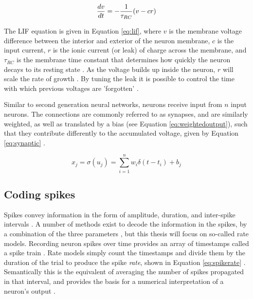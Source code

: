 \documentclass[report.tex]{subfiles}
\begin{document}
\begin{equation}
  \frac{dv}{dt} = - {1 \over \tau_{RC}} (v - cr)
  \label{eq:lif}
\end{equation}

The LIF equation is given in Equation \ref{eq:lif}, where
$v$ is the membrane voltage difference between the interior
and exterior of the neuron membrane, $c$ is the input current, $r$
is the ionic current (or leak) of charge across the membrane, and
$\tau_{RC}$ is the membrane time constant that determines how
quickly the neuron decays to its resting state \cite{Dayan2001, Eliasmith2004}.
As the voltage builds up inside the neuron, $r$ will scale the
rate of growth \cite{Eliasmith2004}.
By tuning the leak it is possible to control the time with which
previous voltages are 'forgotten' \cite{Eliasmith2004}.

Similar to second generation neural networks, neurons
receive input from $n$ input neurons.
The connections are commonly referred to as synapses, and are similarly
weighted, as well as translated by a bias (see Equation \ref{eq:weightedoutput}),
such that they contribute differently to the accumulated 
voltage, given by Equation \ref{eq:synaptic} \cite{Dayan2001}.

\begin{equation}
  x_j = \sigma(u_j) = \sum_{i=1}^n{w_i\delta(t - t_i)} + b_j
  \label{eq:synaptic}
\end{equation}

\subsection{Coding spikes} \label{sec:coding}
Spikes convey information in the form of amplitude, duration, and
inter-spike intervals \cite{Dayan2001}.
A number of methods exist to decode the information in the spikes, by a 
combination of the three parameters \cite{Dayan2001, Eliasmith2015, Diehl2015, Rueckauer2017},
but this thesis will
focus on so-called rate models.
Recording neuron spikes over time provides an array of timestamps called a
spike train \cite{Eliasmith2015}.
Rate models simply count the timestamps and divide them by the duration of
the trial to produce the spike \textit{rate}, shown
in Equation \ref{eq:spikerate} \cite{Dayan2001, Eliasmith2004}.
Semantically this is the equivalent of averaging the number of spikes propagated
in that interval, and provides the basis for a numerical interpretation of a
neuron's output \cite{Eliasmith2004}.
\end{document}
